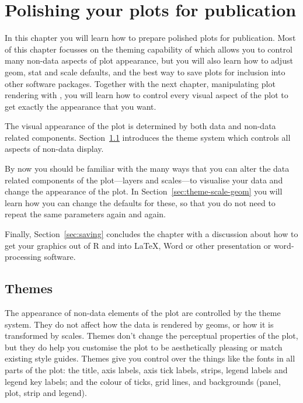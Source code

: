 

% 


\chapter{Polishing your plots for publication}
\label{cha:polishing}

In this chapter you will learn how to prepare polished plots for publication.  Most of this chapter focusses on the theming capability of \ggplot which allows you to control many non-data aspects of plot appearance, but you will also learn how to adjust geom, stat and scale defaults, and the best way to save plots for inclusion into other software packages.  Together with the next chapter, manipulating plot rendering with , you will learn how to control every visual aspect of the plot to get exactly the appearance that you want.

The visual appearance of the plot is determined by both data and non-data related components.  Section~\ref{sec:themes} introduces the theme system which controls all aspects of non-data display.

By now you should be familiar with the many ways that you can alter the data related components of the plot---layers and scales---to visualise your data and change the appearance of the plot.  In Section~\ref{sec:theme-scale-geom} you will learn how you can change the defaults for these, so that you do not need to repeat the same parameters again and again.

Finally, Section~\ref{sec:saving} concludes the chapter with a discussion about how to get your graphics out of R and into \LaTeX, Word or other presentation or word-processing software.


\section{Themes} 
\label{sec:themes}

The appearance of non-data elements of the plot are controlled by the theme system.  They do not affect how the data is rendered by geoms, or how it is transformed by scales.  Themes don't change the perceptual properties of the plot, but they do help you customise the plot to be aesthetically pleasing or match existing style guides.  Themes give you control over the things like the  fonts in all parts of the plot: the title, axis labels, axis tick labels, strips, legend labels and legend key labels; and the colour of ticks, grid lines, and backgrounds (panel, plot, strip and legend).

